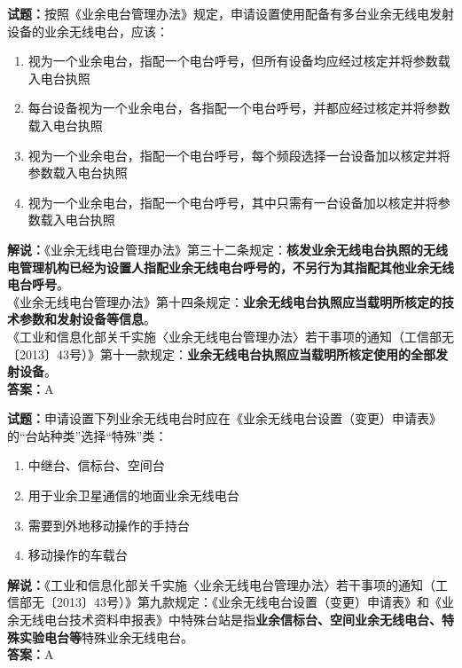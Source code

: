 \documentclass{ctexbook}
\begin{document}
\vspace{1em}

\textbf{试题：}按照《业余电台管理办法》规定，申请设置使用配备有多台业余无线电发射设备的业余无线电台，应该：
\begin{enumerate}[leftmargin=3em]
  \item 视为一个业余电台，指配一个电台呼号，但所有设备均应经过核定并将参数载入电台执照
  \item 每台设备视为一个业余电台，各指配一个电台呼号，并都应经过核定并将参数载入电台执照
  \item 视为一个业余电台，指配一个电台呼号，每个频段选择一台设备加以核定并将参数载入电台执照
  \item 视为一个业余电台，指配一个电台呼号，其中只需有一台设备加以核定并将参数载入电台执照
\end{enumerate}
\noindent\textbf{解说：}《业余无线电台管理办法》第三十二条规定：\textbf{核发业余无线电台执照的无线电管理机构已经为设置人指配业余无线电台呼号的，不另行为其指配其他业余无线电台呼号}。\\
《业余无线电台管理办法》第十四条规定：\textbf{业余无线电台执照应当载明所核定的技术参数和发射设备等信息}。\\
《工业和信息化部关千实施〈业余无线电台管理办法〉若干事项的通知（工信部无〔2013〕43号）》第十一款规定：\textbf{业余无线电台执照应当载明所核定使用的全部发射设备}。\\\noindent\textbf{答案：}A

\vspace{1em}

\textbf{试题：}申请设置下列业余无线电台时应在《业余无线电台设置（变更）申请表》 的“台站种类”选择“特殊”类：
\begin{enumerate}[leftmargin=3em]
  \item 中继台、信标台、空间台
  \item 用于业余卫星通信的地面业余无线电台
  \item 需要到外地移动操作的手持台
  \item 移动操作的车载台
\end{enumerate}
\noindent\textbf{解说：}《工业和信息化部关千实施〈业余无线电台管理办法〉若干事项的通知（工信部无〔2013〕43号）》第九款规定：《业余无线电台设置（变更）申请表》和《业余无线电台技术资料申报表》中特殊台站是指\textbf{业余信标台、空间业余无线电台、特殊实验电台等}特殊业余无线电台。\\\noindent\textbf{答案：}A

\vspace{1em}
\end{document}
